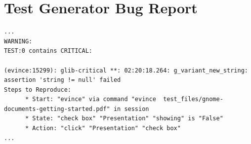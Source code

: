 \chapter{Test Generator Bug Report}\label{bug}
\begin{lstlisting}[language=Gherkin, caption={A demonstration of the bug found by our test generator }]
...
WARNING:
TEST:0 contains CRITICAL:

(evince:15299): glib-critical **: 02:20:18.264: g_variant_new_string: assertion 'string != null' failed
Steps to Reproduce:
      * Start: "evince" via command "evince  test_files/gnome-documents-getting-started.pdf" in session
      * State: "check box" "Presentation" "showing" is "False"
      * Action: "click" "Presentation" "check box"
...
\end{lstlisting}


